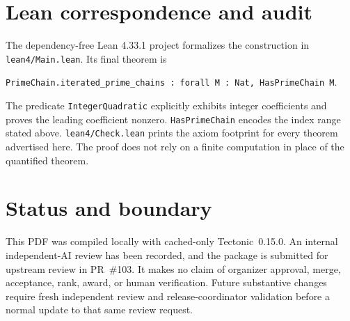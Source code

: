 \documentclass[11pt]{article}
\begin{document}
\section*{Lean correspondence and audit}
The dependency-free Lean 4.33.1 project formalizes the construction in
\texttt{lean4/Main.lean}. Its final theorem is
\begin{center}
\texttt{PrimeChain.iterated\_prime\_chains : forall M : Nat, HasPrimeChain M}.
\end{center}
The predicate \texttt{IntegerQuadratic} explicitly exhibits integer
coefficients and proves the leading coefficient nonzero. \texttt{HasPrimeChain}
encodes the index range stated above. \texttt{lean4/Check.lean} prints the axiom
footprint for every theorem advertised here. The proof does not rely on a
finite computation in place of the quantified theorem.

\section*{Status and boundary}
This PDF was compiled locally with cached-only Tectonic~0.15.0. An internal
independent-AI review has been recorded, and the package is submitted for upstream
review in PR~\#103. It makes no claim of organizer approval, merge, acceptance,
rank, award, or human verification. Future substantive changes require fresh
independent review and release-coordinator validation before a normal update to
that same review request.
\end{document}
